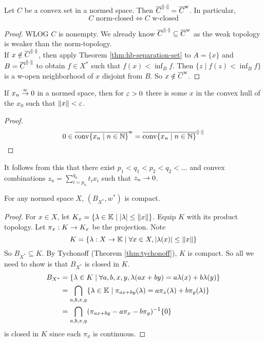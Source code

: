 \documentclass{article}
\begin{document}
\begin{nthm}[Mazur]
  Let $C$ be a convex set in a normed space. Then $\overline{C}^{\left\lVert \cdot\right\rVert} = \overline{C}^{\text w}$. In particular,
  $$C \text{ norm-closed} \iff C \text{ w-closed}$$
\end{nthm}
\begin{proof}
  WLOG $C$ is nonempty. We already know $\overline{C}^{\left\lVert \cdot\right\rVert} \subseteq \overline{C}^{\text w}$ as the weak topology is weaker than the norm-topology. \\
  If $x \notin \overline{C}^{\left\lVert \cdot\right\rVert}$, then apply Theorem \ref{thm:hb-separation-set} to $A = \{x\}$ and $B = \overline{C}^{\left\lVert \cdot\right\rVert}$ to obtain $f \in X^*$ such that $f(x) < \inf_B f$. Then $\{z \mid f(z) < \inf_B f\}$ is a w-open neighborhood of $x$ disjoint from $B$. So $x \notin \overline{C}^{\text w}$.
\end{proof}

\begin{ncor}
  If $x_n \overset w{\rightarrow} 0$ in a normed space, then for $\varepsilon > 0$ there is some $x$ in the convex hull of the $x_0$ such that $\left\lVert x\right\rVert < \varepsilon$.
\end{ncor}
\begin{proof}
  $$0 \in \overline{\operatorname{conv}\{x_n \mid n \in \mathbb N\}}^{\text w} = \overline{\operatorname{conv}\{x_n \mid n \in \mathbb N\}}^{\left\lVert \cdot\right\rVert}$$
\end{proof}

\begin{rmk}
  It follows from this that there exist $p_1 < q_1 < p_2 < q_2 < \dots $ and convex combinations $z_n = \sum_{i = p_n}^{q_n} t_i x_i$ such that $z_n \rightarrow 0$.
\end{rmk}

\newlec

\begin{nthm}\label{thm:banach-alaoglu}
  For any normed space $X$, $(B_{X^*}, w^*)$ is compact.
\end{nthm}
\begin{proof}
  For $x \in X$, let $K_x = \{\lambda \in \mathbb K \mid \left\lvert \lambda\right\rvert \le \left\lVert x\right\rVert\}$. Equip $K$ with its product topology. Let $\pi_x : K \rightarrow K_x$ be the projection. Note
  $$K = \{\lambda : X \rightarrow \mathbb K \mid \forall x \in X, \left\lvert \lambda(x)\right\rvert \le \left\lVert x\right\rVert\}$$
  So $B_{X^*} \subseteq K$. By Tychonoff (Theorem \ref{thm:tychonoff}), $K$ is compact. So all we need to show is that $B_{X^*}$ is closed in $K$.
  \begin{align*}
    B_{X^*}
    & = \{\lambda \in K \mid \forall a, b, x, y, \lambda(ax + by) = a\lambda(x) + b\lambda(y)\} \\
    & = \bigcap_{a, b, x, y} \{\lambda \in \mathbb K \mid \pi_{ax + by}(\lambda) = a\pi_x(\lambda) + b\pi_y(\lambda)\} \\
    & = \bigcap_{a, b, x, y} (\pi_{ax + by} - a\pi_x - b\pi_y)^{-1}\{0\}
  \end{align*}
  is closed in $K$ since each $\pi_x$ is continuous.
\end{proof}
\end{document}
